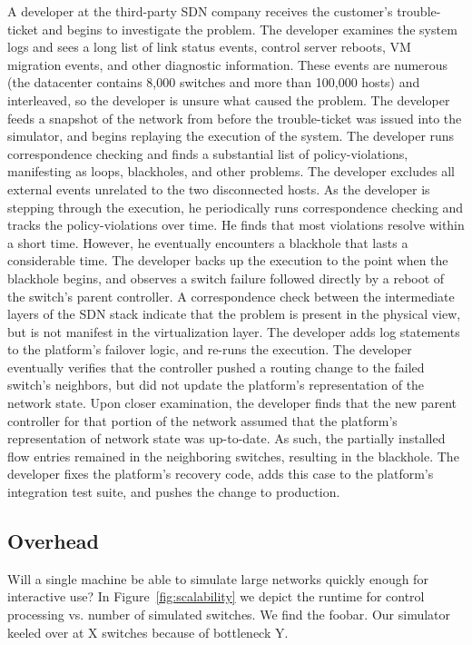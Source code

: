  A developer at the third-party SDN
company receives the customer's trouble-ticket and begins to investigate the
problem. The developer examines the system logs and sees a
long list of link status events, control server reboots, VM migration events,
and other diagnostic information. These events are numerous (the
datacenter contains 8,000 switches and more than 100,000 hosts) and
interleaved, so the developer is unsure what caused the problem.
The developer feeds a snapshot of the network from before the
trouble-ticket was issued into the simulator, and
begins replaying the execution of the system. The developer runs
correspondence checking and finds a substantial list of policy-violations,
manifesting as loops, blackholes, and other problems.
The developer excludes all external events
unrelated to the two disconnected hosts. As the developer is stepping through the execution, he periodically
runs correspondence checking and tracks the policy-violations over time. He
finds that most violations resolve within a short time. However, he
eventually encounters a blackhole that lasts a considerable time. The
developer backs up the execution to the point when the blackhole begins, and
observes a switch failure followed directly by a reboot of the switch's parent
controller. A correspondence check between the intermediate layers of the SDN
stack indicate that the problem is present in the
physical view, but is not manifest in the virtualization layer. The developer adds log statements to the platform's failover
logic, and re-runs the execution. The developer eventually verifies that the
controller pushed a routing change to the failed switch's neighbors, but did
not update the platform's representation of the network state. Upon closer
examination, the developer finds that the new parent controller for that
portion of the network assumed that the platform's
representation of network state was up-to-date. As such, the partially installed flow entries remained
in the neighboring switches, resulting in the blackhole. The developer fixes
the platform's recovery code, adds this case to the platform's integration
test suite, and pushes the change to production. 

\subsection{Overhead}

 Will a single machine be able to 
simulate large networks quickly enough for interactive use? In
Figure~\ref{fig:scalability} we depict the runtime for control processing vs.
number of simulated switches. We find the foobar. Our simulator keeled over at
X switches because of bottleneck Y.

